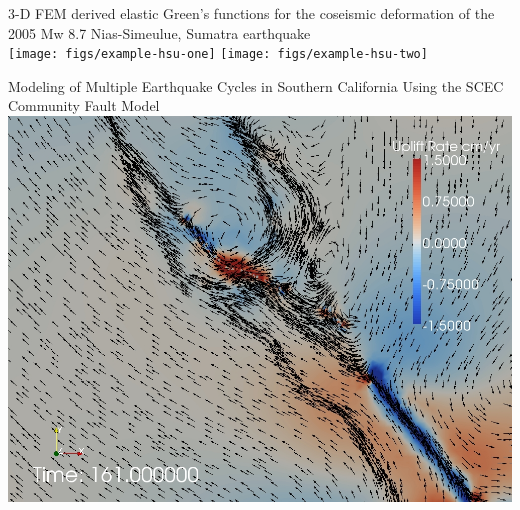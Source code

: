 \documentclass[pdftex,cig,slideColor]{pp4slides}
\begin{document}

  \vfill

 \begin{center}
  3-D FEM derived elastic Green's functions for the coseismic deformation of the
  2005 Mw 8.7 Nias-Simeulue, Sumatra earthquake \\
  \texttt{[image: figs/example-hsu-one]}\hspace{0.5in}
  \texttt{[image: figs/example-hsu-two]}
 \end{center}


  \vfill

\begin{center}
  Modeling of Multiple Earthquake Cycles in Southern California Using the SCEC
  Community Fault Model \\
  \includegraphics[scale=0.45]{figs/example-williams}
 \end{center}


  \vfill
\end{document}
